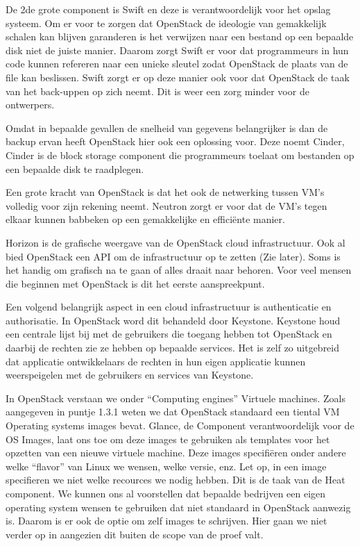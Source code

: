 De 2de grote component is Swift en deze is verantwoordelijk voor het opslag systeem. Om er voor te zorgen dat OpenStack de ideologie van gemakkelijk schalen kan blijven garanderen is het verwijzen naar een bestand op een bepaalde disk niet de juiste manier. Daarom zorgt Swift er voor dat programmeurs in hun code kunnen refereren naar een unieke sleutel zodat OpenStack de plaats van de file kan beslissen. Swift zorgt er op deze manier ook voor dat OpenStack de taak van het back-uppen op zich neemt. Dit is weer een zorg minder voor de ontwerpers.

Omdat in bepaalde gevallen de snelheid van gegevens belangrijker is dan de backup ervan heeft OpenStack hier ook een oplossing voor. Deze noemt Cinder, Cinder is de block storage component die programmeurs toelaat om bestanden op een bepaalde disk te raadplegen.

Een grote kracht van OpenStack is dat het ook de netwerking tussen VM’s volledig voor zijn rekening neemt. Neutron zorgt er voor dat de VM’s tegen elkaar kunnen babbeken op een gemakkelijke en efficiënte manier.

Horizon is de grafische weergave van de OpenStack cloud infrastructuur. Ook al bied OpenStack een API om de infrastructuur op te zetten (Zie later). Soms is het handig om grafisch na te gaan of alles draait naar behoren. Voor veel mensen die beginnen met OpenStack is dit het eerste aanspreekpunt.

Een volgend belangrijk aspect in een cloud infrastructuur is authenticatie en authorisatie. In OpenStack word dit behandeld door Keystone. Keystone houd een centrale lijst bij met de gebruikers die toegang hebben tot OpenStack en daarbij de rechten zie ze hebben op bepaalde services. Het is zelf zo uitgebreid dat applicatie ontwikkelaars de rechten in hun eigen applicatie kunnen weerspeigelen met de gebruikers en services van Keystone.

In OpenStack verstaan we onder “Computing engines” Virtuele machines. Zoals aangegeven in puntje 1.3.1 weten we dat OpenStack standaard een tiental VM Operating systems images bevat. Glance, de Component verantwoordelijk voor de OS Images, laat ons toe om deze images te gebruiken als templates voor het opzetten van een nieuwe virtuele machine. Deze images specifiëren onder andere welke “flavor” van Linux we wensen, welke versie, enz. Let op, in een image specifieren we niet welke recources we nodig hebben. Dit is de taak van de Heat component. 
We kunnen ons al voorstellen dat bepaalde bedrijven een eigen operating system wensen te gebruiken dat niet standaard in OpenStack aanwezig is. Daarom is er ook de optie om zelf images te schrijven. Hier gaan we niet verder op in aangezien dit buiten de scope van de proef valt.

